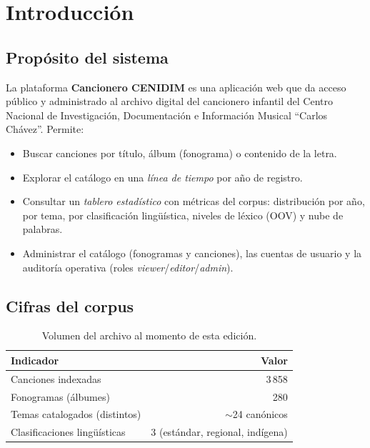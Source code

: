 \documentclass[11pt,letterpaper,twoside]{report}
\begin{document}
\tableofcontents
\cleardoublepage
\listoftables
\cleardoublepage
{}

\chapter{Introducción}

\section{Propósito del sistema}
La plataforma \textbf{Cancionero CENIDIM} es una aplicación web que da
acceso público y administrado al archivo digital del cancionero
infantil del Centro Nacional de Investigación, Documentación e
Información Musical ``Carlos Chávez''. Permite:

\begin{itemize}
  \item Buscar canciones por título, álbum (fonograma) o contenido de
        la letra.
  \item Explorar el catálogo en una \emph{línea de tiempo} por año de
        registro.
  \item Consultar un \emph{tablero estadístico} con métricas del
        corpus: distribución por año, por tema, por clasificación
        lingüística, niveles de léxico (OOV) y nube de palabras.
  \item Administrar el catálogo (fonogramas y canciones), las cuentas
        de usuario y la auditoría operativa (roles
        \emph{viewer}/\emph{editor}/\emph{admin}).
\end{itemize}

\section{Cifras del corpus}
\begin{table}[h]
  \centering
  \begin{tabular}{lr}
    \toprule
    \textbf{Indicador} & \textbf{Valor} \\
    \midrule
    Canciones indexadas            & 3\,858 \\
    Fonogramas (álbumes)           & 280    \\
    Temas catalogados (distintos)  & $\sim$24 canónicos \\
    Clasificaciones lingüísticas   & 3 (estándar, regional, indígena) \\
    \bottomrule
  \end{tabular}
  \caption{Volumen del archivo al momento de esta edición.}
  \label{tab:corpus}
\end{table}
\end{document}
